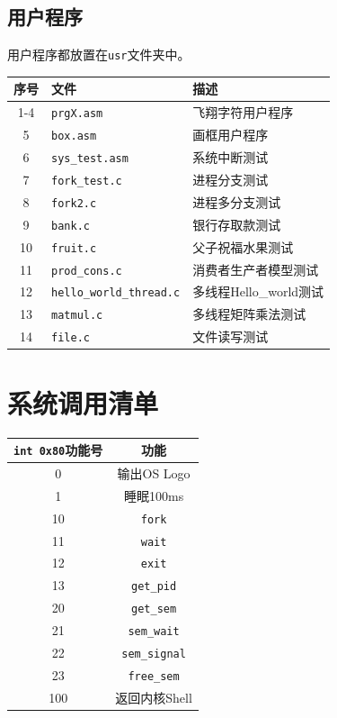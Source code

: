 \documentclass[logo,reportComp]{thesis}
\begin{document}
\subsection{用户程序}
用户程序都放置在\verb'usr'文件夹中。
\begin{center}
\begin{tabular}{|c|l|l|}\hline
\textbf{序号} & \textbf{文件} & \textbf{描述} \\\hline
1-4 & \verb'prgX.asm' & 飞翔字符用户程序\\\hline
5 & \verb'box.asm' & 画框用户程序\\\hline
6 & \verb'sys_test.asm' & 系统中断测试\\\hline
7 & \verb'fork_test.c' & 进程分支测试\\\hline
8 & \verb'fork2.c' & 进程多分支测试\\\hline
9 & \verb'bank.c' & 银行存取款测试\\\hline
10 & \verb'fruit.c' & 父子祝福水果测试\\\hline
11 & \verb'prod_cons.c' & 消费者生产者模型测试\\\hline
12 & \verb'hello_world_thread.c' & 多线程Hello\_world测试\\\hline
13 & \verb'matmul.c' & 多线程矩阵乘法测试\\\hline
14 & \verb'file.c' & 文件读写测试\\\hline
\end{tabular}
\end{center}

\section{系统调用清单}
\label{sec:syscall}
\begin{center}
\begin{tabular}{|c|c|}\hline
\verb'int 0x80'\textbf{功能号} & \textbf{功能}\\\hline
0 & 输出OS Logo\\\hline
1 & 睡眠100ms\\\hline
10 & \verb'fork'\\\hline
11 & \verb'wait'\\\hline
12 & \verb'exit'\\\hline
13 & \verb'get_pid'\\\hline
20 & \verb'get_sem'\\\hline
21 & \verb'sem_wait'\\\hline
22 & \verb'sem_signal'\\\hline
23 & \verb'free_sem'\\\hline
100 & 返回内核Shell\\\hline
\end{tabular}
\end{center}
\end{document}
